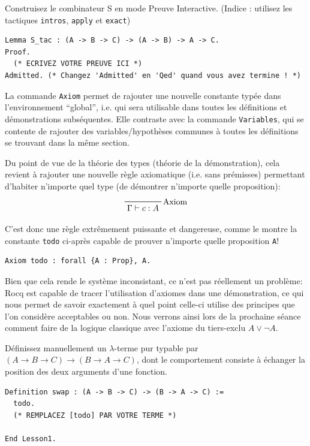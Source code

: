 \documentclass[11pt,a4paper]{article}
\begin{document}
\begin{exercice}{}{}
  Construisez le combinateur S en mode Preuve Interactive. (Indice : utilisez les tactiques \texttt{intros}, \texttt{apply} et \texttt{exact})
\end{exercice}

\begin{lstlisting}
Lemma S_tac : (A -> B -> C) -> (A -> B) -> A -> C.
Proof.
  (* ECRIVEZ VOTRE PREUVE ICI *)
Admitted. (* Changez 'Admitted' en 'Qed' quand vous avez termine ! *)
\end{lstlisting}

La commande \texttt{Axiom} permet de rajouter une nouvelle constante typée dans l'environnement ``global'', i.e. qui sera utilisable dans toutes les définitions et démonstrations subséquentes. Elle contraste avec la commande \texttt{Variables}, qui se contente de rajouter des variables/hypothèses communes à toutes les définitions se trouvant dans la même section.

Du point de vue de la théorie des types (théorie de la démonstration), cela revient à rajouter une nouvelle règle axiomatique (i.e. sans prémisses) permettant d'habiter n'importe quel type (de démontrer n'importe quelle proposition):
$$\prftree[r]{Axiom}{\Gamma \vdash c : A}$$

C'est donc une règle extrêmement puissante et dangereuse, comme le montre la constante \texttt{todo} ci-après capable de prouver n'importe quelle proposition \texttt{A}!

\begin{lstlisting}
Axiom todo : forall {A : Prop}, A.
\end{lstlisting}

Bien que cela rende le système inconsistant, ce n'est pas réellement un problème: Rocq est capable de tracer l'utilisation d'axiomes dans une démonstration, ce qui nous permet de savoir exactement à quel point celle-ci utilise des principes que l'on considère acceptables ou non. Nous verrons ainsi lors de la prochaine séance comment faire de la logique classique avec l'axiome du tiers-exclu $A \lor \neg A$.

\begin{exercice}{}{}
  Définissez manuellement un $\lambda$-terme pur typable par $(A \to B \to C) \to (B \to A \to C)$, dont le comportement consiste à échanger la position des deux arguments d'une fonction.
\end{exercice}

\begin{lstlisting}
Definition swap : (A -> B -> C) -> (B -> A -> C) :=
  todo.
  (* REMPLACEZ [todo] PAR VOTRE TERME *)

End Lesson1.
\end{lstlisting}
\end{document}
